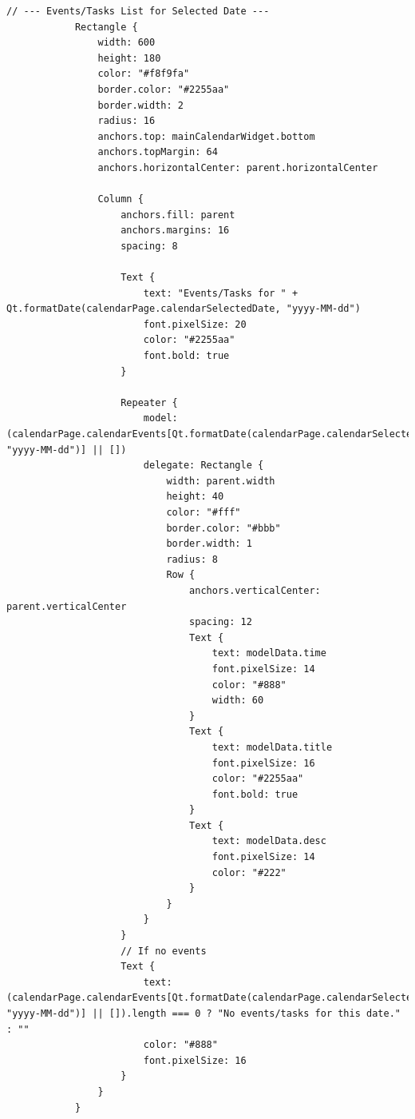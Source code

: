 \documentclass{report}
\begin{document}
\begin{lstlisting}[style=qmlstyle]
            // --- Events/Tasks List for Selected Date ---
            Rectangle {
                width: 600
                height: 180
                color: "#f8f9fa"
                border.color: "#2255aa"
                border.width: 2
                radius: 16
                anchors.top: mainCalendarWidget.bottom
                anchors.topMargin: 64
                anchors.horizontalCenter: parent.horizontalCenter

                Column {
                    anchors.fill: parent
                    anchors.margins: 16
                    spacing: 8

                    Text {
                        text: "Events/Tasks for " + Qt.formatDate(calendarPage.calendarSelectedDate, "yyyy-MM-dd")
                        font.pixelSize: 20
                        color: "#2255aa"
                        font.bold: true
                    }

                    Repeater {
                        model: (calendarPage.calendarEvents[Qt.formatDate(calendarPage.calendarSelectedDate, "yyyy-MM-dd")] || [])
                        delegate: Rectangle {
                            width: parent.width
                            height: 40
                            color: "#fff"
                            border.color: "#bbb"
                            border.width: 1
                            radius: 8
                            Row {
                                anchors.verticalCenter: parent.verticalCenter
                                spacing: 12
                                Text {
                                    text: modelData.time
                                    font.pixelSize: 14
                                    color: "#888"
                                    width: 60
                                }
                                Text {
                                    text: modelData.title
                                    font.pixelSize: 16
                                    color: "#2255aa"
                                    font.bold: true
                                }
                                Text {
                                    text: modelData.desc
                                    font.pixelSize: 14
                                    color: "#222"
                                }
                            }
                        }
                    }
                    // If no events
                    Text {
                        text: (calendarPage.calendarEvents[Qt.formatDate(calendarPage.calendarSelectedDate, "yyyy-MM-dd")] || []).length === 0 ? "No events/tasks for this date." : ""
                        color: "#888"
                        font.pixelSize: 16
                    }
                }
            }


\end{lstlisting}
\end{document}

